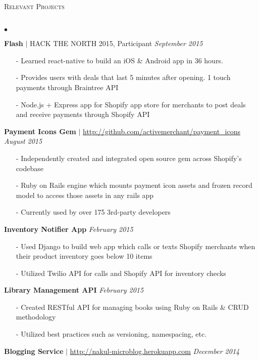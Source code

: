 \documentclass[10pt]{article}
\newcommand{\lineunder}{\vspace*{-8pt} \\ \hspace*{-18pt} \hrulefill \\}
\newcommand{\header}[1]{{\hspace*{-15pt}\vspace*{6pt} \textsc{#1}} \vspace*{-6pt} \lineunder}
\newenvironment{achievements}{\begin{list}{$\bullet$}{\topsep 0pt \itemsep -1.5pt \leftmargin 5pt}}{\vspace*{4pt}\end{list}}
\begin{document}
\vspace{6pt}

\header{\normalsize Relevant Projects}
\begin{achievements}
\def\UrlFont{\em}
\item \textbf{Flash} {$|$ \scriptsize HACK THE NORTH 2015, Participant}  \hfill \textit {September 2015}
\begin{itemize}
\item[-]Learned react-native to build an iOS \& Android app in 36 hours. 
\item[-]Provides users with deals that last 5 minutes after opening. 1 touch payments through Braintree API
\item[-]Node.js + Express app for Shopify app store for merchants to post deals and receive payments through Shopify API
\end{itemize}
\item \textbf{Payment Icons Gem} $|$ \url{http://github.com/activemerchant/payment_icons} \hfill \textit {August 2015}
\begin{itemize}
\item[-]Independently created and integrated open source gem across Shopify's codebase
\item[-]Ruby on Rails engine which mounts payment icon assets and frozen record model to access those assets in any rails app
\item[-]Currently used by over 175 3rd-party developers
\end{itemize}
\item \textbf{Inventory Notifier App}  \hfill \textit {February 2015}
\begin{itemize}
\item[-]Used Django to build web app which calls or texts Shopify merchants when their product inventory goes below 10 items
\item[-]Utilized Twilio API for calls and Shopify API for inventory checks
\end{itemize}
\item \textbf{Library Management API}  \hfill \textit {February 2015}
\begin{itemize}
\item[-]Created RESTful API for managing books using Ruby on Rails \& CRUD methodology
\item[-]Utilized best practices such as versioning, namespacing, etc.
\end{itemize}
\item \textbf{Blogging Service} $|$ \url{http://nakul-microblog.herokuapp.com} \hfill \textit {December 2014}

\end{achievements}
\end{document}
